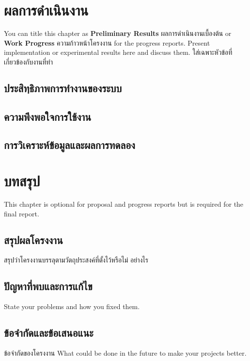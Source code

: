 \documentclass[12pt,oneside,openright,a4paper]{cpe-thai-project}
\begin{document}
\chapter{ผลการดำเนินงาน}

You can title this chapter as \textbf{Preliminary Results} ผลการดำเนินงานเบื้องต้น or \textbf{Work Progress} ความก้าวหน้าโครงงาน for the progress reports. Present implementation or experimental results here and discuss them.
ใส่เฉพาะหัวข้อที่เกี่ยวข้องกับงานที่ทำ 

\section{ประสิทฺธิภาพการทำงานของระบบ} 
\section{ความพึงพอใจการใช้งาน}
\section{การวิเคราะห์ข้อมูลและผลการทดลอง}

\chapter{บทสรุป}

This chapter is optional for proposal and progress reports but 
is required for the final report.

\section{สรุปผลโครงงาน}
สรุปว่าโครงงานบรรลุตามวัตถุประสงค์ที่ตั้งไว้หรือไม่ อย่างไร 

\section{ปัญหาที่พบและการแก้ไข}
State your problems and how you fixed them.

\section{ข้อจำกัดและข้อเสนอแนะ}
ข้อจำกัดของโครงงาน What could be done in the future to make your projects better.
\end{document}
